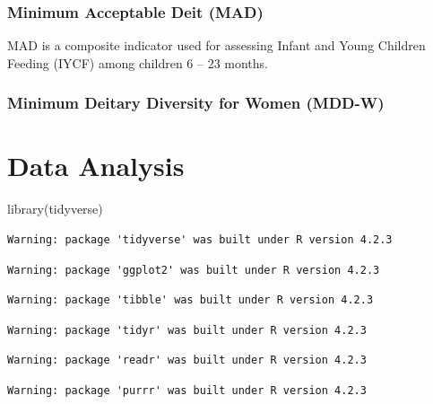 \documentclass[
  letterpaper,
  DIV=11,
  numbers=noendperiod]{scrreprt}
\newenvironment{Shaded}{\begin{snugshade}}{\end{snugshade}}
\newcommand{\FunctionTok}[1]{\textcolor[rgb]{0.28,0.35,0.67}{#1}}
\newcommand{\NormalTok}[1]{\textcolor[rgb]{0.00,0.23,0.31}{#1}}
\begin{document}
\hypertarget{minimum-acceptable-deit-mad}{%
\subsection{Minimum Acceptable Deit
(MAD)}\label{minimum-acceptable-deit-mad}}

MAD is a composite indicator used for assessing Infant and Young
Children Feeding (IYCF) among children 6 -- 23 months.

\hypertarget{minimum-deitary-diversity-for-women-mdd-w}{%
\subsection{Minimum Deitary Diversity for Women
(MDD-W)}\label{minimum-deitary-diversity-for-women-mdd-w}}


\hypertarget{data-analysis}{%
\chapter{Data Analysis}\label{data-analysis}}

\begin{Shaded}
\begin{Highlighting}[]
\FunctionTok{library}\NormalTok{(tidyverse)}
\end{Highlighting}
\end{Shaded}

\begin{verbatim}
Warning: package 'tidyverse' was built under R version 4.2.3
\end{verbatim}

\begin{verbatim}
Warning: package 'ggplot2' was built under R version 4.2.3
\end{verbatim}

\begin{verbatim}
Warning: package 'tibble' was built under R version 4.2.3
\end{verbatim}

\begin{verbatim}
Warning: package 'tidyr' was built under R version 4.2.3
\end{verbatim}

\begin{verbatim}
Warning: package 'readr' was built under R version 4.2.3
\end{verbatim}

\begin{verbatim}
Warning: package 'purrr' was built under R version 4.2.3
\end{verbatim}
\end{document}
